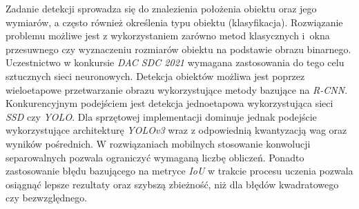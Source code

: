 Zadanie detekcji sprowadza się do znalezienia położenia obiektu oraz jego wymiarów, a często również określenia typu obiektu (klasyfikacja). 
Rozwiązanie problemu możliwe jest z wykorzystaniem zarówno metod klasycznych i~okna przesuwnego czy wyznaczeniu rozmiarów obiektu na podstawie obrazu binarnego.
Uczestnictwo w konkursie \emph{DAC SDC 2021} wymagana zastosowania do tego celu sztucznych sieci neuronowych.
Detekcja obiektów możliwa jest poprzez wieloetapowe przetwarzanie obrazu wykorzystujące metody bazujące na \emph{R-CNN}. 
Konkurencyjnym podejściem jest detekcja jednoetapowa wykorzystująca sieci \emph{SSD} czy \emph{YOLO}.
Dla sprzętowej implementacji dominuje jednak podejście wykorzystujące architekturę \emph{YOLOv3} wraz z odpowiednią kwantyzacją wag oraz wyników pośrednich.
W rozwiązaniach mobilnych stosowanie konwolucji separowalnych pozwala ograniczyć wymaganą liczbę obliczeń.
Ponadto zastosowanie błędu bazującego na metryce \emph{IoU} w trakcie procesu uczenia pozwala osiągnąć lepsze rezultaty oraz szybszą zbieżność, niż dla błędów kwadratowego czy bezwzględnego.




